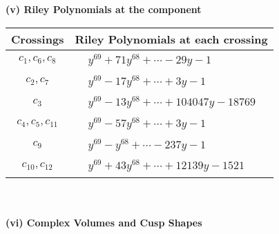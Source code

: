 \documentclass[1p]{elsarticle_modified}
\theoremstyle{definition}
\begin{document}
\newpage\renewcommand{\arraystretch}{1}
\flushleft \textbf{(v) Riley Polynomials at the component}\newline \\
\begin{tabular}{m{50pt}|m{274pt}}
Crossings & \hspace{64pt}Riley Polynomials at each crossing \\
\hline $$\begin{aligned}c_{1},c_{6},c_{8}\end{aligned}$$&$\begin{aligned}
&y^{69}+71 y^{68}+\cdots-29 y-1
\end{aligned}$\\
\hline $$\begin{aligned}c_{2},c_{7}\end{aligned}$$&$\begin{aligned}
&y^{69}-17 y^{68}+\cdots+3 y-1
\end{aligned}$\\
\hline $$\begin{aligned}c_{3}\end{aligned}$$&$\begin{aligned}
&y^{69}-13 y^{68}+\cdots+104047 y-18769
\end{aligned}$\\
\hline $$\begin{aligned}c_{4},c_{5},c_{11}\end{aligned}$$&$\begin{aligned}
&y^{69}-57 y^{68}+\cdots+3 y-1
\end{aligned}$\\
\hline $$\begin{aligned}c_{9}\end{aligned}$$&$\begin{aligned}
&y^{69}- y^{68}+\cdots-237 y-1
\end{aligned}$\\
\hline $$\begin{aligned}c_{10},c_{12}\end{aligned}$$&$\begin{aligned}
&y^{69}+43 y^{68}+\cdots+12139 y-1521
\end{aligned}$\\
\hline
\end{tabular}\\~\\
\newpage\flushleft \textbf{(vi) Complex Volumes and Cusp Shapes}
\end{document}
